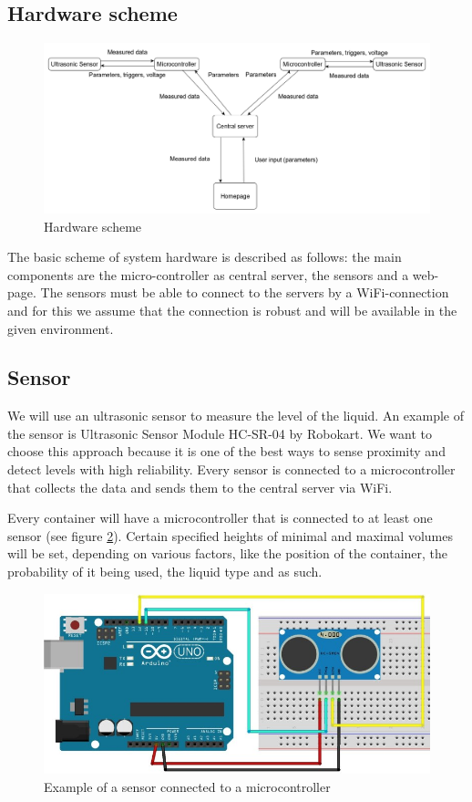 \documentclass{article}
\begin{document}
\subsection{Hardware scheme}

\begin{figure}[h]
\label{scheme}
\hspace{-1cm}
\includegraphics[scale=0.325]{images/circuit3.png}
\caption{Hardware scheme}
\end{figure}

The basic scheme of system hardware is described as follows: the main components
are the micro-controller as central server, the sensors and a web-page. The
sensors must be able to connect to the servers by a WiFi-connection and for this
we assume that the connection is robust and will be available in the given
environment. \par

\subsection{Sensor}
We will use an ultrasonic sensor to measure the level of the liquid. An example of the sensor is Ultrasonic Sensor Module HC-SR-04 by Robokart. 
We want to choose this approach because it is one of the best ways to sense proximity and detect levels with high reliability. Every sensor is connected to a microcontroller 
that collects the data and sends them to the central server via WiFi.  

Every container will have a microcontroller that is connected to at least one sensor (see figure \ref{sensorWithArduino}).
Certain specified heights of minimal and maximal volumes will be set, depending
on various factors, like the position of the container, the probability of it being used, 
the liquid type and as such.

\begin{figure}[h]
\includegraphics[scale=0.5]{sensorAndArduino.jpg}
\caption{Example of a sensor connected to a microcontroller}
\label{sensorWithArduino}
\end{figure}
\end{document}

